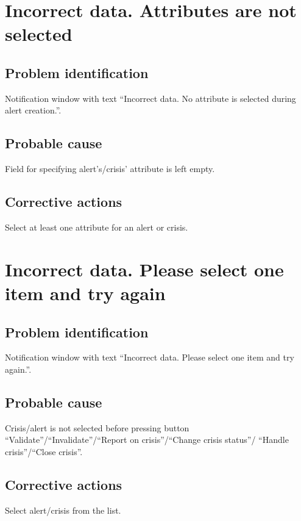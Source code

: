 \section{Incorrect data. Attributes are not selected}

\subsection{Problem identification}
Notification window with text ``Incorrect data. No attribute is selected during
alert creation.''.

\subsection{Probable cause}
Field for specifying alert's/crisis' attribute is left empty.

\subsection{Corrective actions}
Select at least one attribute for an alert or crisis.

\section{Incorrect data. Please select one item and try again}

\subsection{Problem identification}
Notification window with text ``Incorrect data. Please select one item and try
again.''.

\subsection{Probable cause}
Crisis/alert is not selected before pressing button
``Validate''/``Invalidate''/``Report on crisis''/``Change crisis status''/
``Handle crisis''/``Close crisis''.

\subsection{Corrective actions}
Select alert/crisis from the list.
